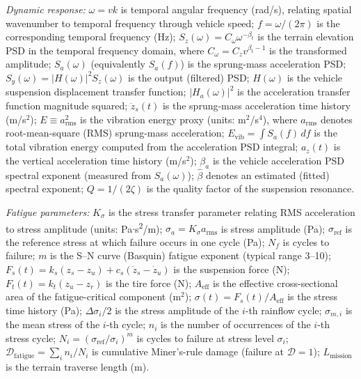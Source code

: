 \documentclass[11pt]{article}
\begin{document}
\textit{Dynamic response:} $\omega = vk$ is temporal angular frequency (rad/s), relating spatial wavenumber to temporal frequency through vehicle speed; $f = \omega/(2\pi)$ is the corresponding temporal frequency (Hz); $S_z(\omega) = C_\omega \omega^{-\beta_t}$ is the terrain elevation PSD in the temporal frequency domain, where $C_\omega = C_z v^{\beta_t - 1}$ is the transformed amplitude; $S_a(\omega)$ (equivalently $S_a(f)$) is the sprung-mass acceleration PSD; $S_y(\omega) = |H(\omega)|^2 S_z(\omega)$ is the output (filtered) PSD; $H(\omega)$ is the vehicle suspension displacement transfer function; $|H_a(\omega)|^2$ is the acceleration transfer function magnitude squared; $\ddot{z}_s(t)$ is the sprung-mass acceleration time history (m/s$^2$); $E \equiv a_{\mathrm{rms}}^2$ is the vibration energy proxy (units: m$^2$/s$^4$), where $a_{\mathrm{rms}}$ denotes root-mean-square (RMS) sprung-mass acceleration; $E_{\mathrm{vib}} = \int S_a(f)\,df$ is the total vibration energy computed from the acceleration PSD integral; $a_z(t)$ is the vertical acceleration time history (m/s$^2$); $\beta_a$ is the vehicle acceleration PSD spectral exponent (measured from $S_a(\omega)$); $\hat{\beta}$ denotes an estimated (fitted) spectral exponent; $Q = 1/(2\zeta)$ is the quality factor of the suspension resonance.

\textit{Fatigue parameters:} $K_\sigma$ is the stress transfer parameter relating RMS acceleration to stress amplitude (units: Pa$\cdot$s\textsuperscript{2}/m); $\sigma_a = K_\sigma a_{\mathrm{rms}}$ is stress amplitude (Pa); $\sigma_{\text{ref}}$ is the reference stress at which failure occurs in one cycle (Pa); $N_f$ is cycles to failure; $m$ is the S--N curve (Basquin) fatigue exponent (typical range 3--10); $F_s(t) = k_s(z_s - z_u) + c_s(\dot{z}_s - \dot{z}_u)$ is the suspension force (N); $F_t(t) = k_t(z_u - z_r)$ is the tire force (N); $A_{\text{eff}}$ is the effective cross-sectional area of the fatigue-critical component (m$^2$); $\sigma(t) = F_s(t)/A_{\text{eff}}$ is the stress time history (Pa); $\Delta\sigma_i / 2$ is the stress amplitude of the $i$-th rainflow cycle; $\sigma_{m,i}$ is the mean stress of the $i$-th cycle; $n_i$ is the number of occurrences of the $i$-th stress cycle; $N_i = (\sigma_{\text{ref}}/\sigma_i)^m$ is cycles to failure at stress level $\sigma_i$; $\mathcal{D}_{\text{fatigue}} = \sum_i n_i/N_i$ is cumulative Miner's-rule damage (failure at $\mathcal{D} = 1$); $L_{\text{mission}}$ is the terrain traverse length (m).
\end{document}
